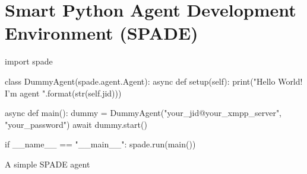 \section[SPADE]{Smart Python Agent Development Environment (SPADE)}

\begin{frame}[fragile]{\insertsection}
    \begin{listing}
        \begin{mintedPython}
import spade

class DummyAgent(spade.agent.Agent):
    async def setup(self):
        print("Hello World! I'm agent {}".format(str(self.jid)))

async def main():
    dummy = DummyAgent("your_jid@your_xmpp_server", "your_password")
    await dummy.start()

if __name__ == "__main__":
    spade.run(main())
        \end{mintedPython}
        \caption{A simple SPADE agent}
    \end{listing}
\end{frame}

\begin{frame}{\insertsection}
\end{frame}


